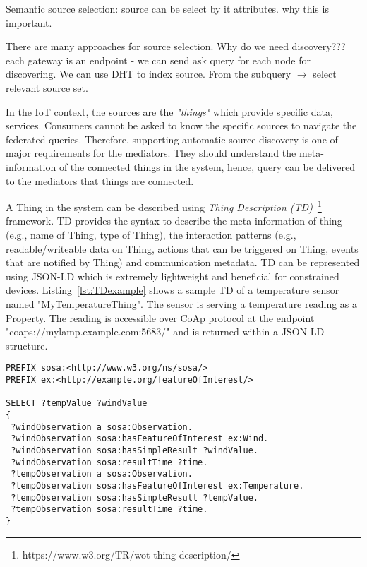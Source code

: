 Semantic source selection: source can be select by it attributes.
why this is important. 

There are many approaches for source selection. Why do we need discovery???
each gateway is an endpoint - we can send ask query for each node for discovering.
We can use DHT to index source. From the subquery $\to$ select relevant source set.





In the IoT context, the sources are the \textit{"things"} which provide specific data, services.
Consumers cannot be asked to know the specific sources to navigate the federated queries.
Therefore, supporting automatic source discovery is one of major requirements for the mediators.
They should understand the meta-information of the connected things in the system, hence, 
query can be delivered to the mediators that things are connected.









A Thing in the system can be described using \textit{Thing Description (TD)}~\footnote{https://www.w3.org/TR/wot-thing-description/} framework. 
TD provides the syntax to describe the meta-information of thing (e.g., name of Thing, type of Thing), 
the interaction patterns (e.g., readable/writeable data on Thing, 
actions that can be triggered on Thing, events that are notified by Thing) and communication metadata.
TD can be represented using JSON-LD which is extremely lightweight and beneficial for constrained devices.
Listing~\ref{lst:TDexample} shows a sample TD of a temperature sensor named "MyTemperatureThing".
The sensor is serving a temperature reading as a Property.
The reading is accessible over CoAp protocol at the endpoint "coaps://mylamp.example.com:5683/" and is returned within a JSON-LD structure.


\begin{lstlisting}[language=sparql,
  				   captionpos=b,
                   label={lst:TDexample},
                   caption={SPARQL}]       
PREFIX sosa:<http://www.w3.org/ns/sosa/>                   
PREFIX ex:<http://example.org/featureOfInterest/>                   

SELECT ?tempValue ?windValue
{
 ?windObservation a sosa:Observation. 
 ?windObservation sosa:hasFeatureOfInterest ex:Wind.
 ?windObservation sosa:hasSimpleResult ?windValue.
 ?windObservation sosa:resultTime ?time.
 ?tempObservation a sosa:Observation.
 ?tempObservation sosa:hasFeatureOfInterest ex:Temperature.
 ?tempObservation sosa:hasSimpleResult ?tempValue.
 ?tempObservation sosa:resultTime ?time.
}
\end{lstlisting}



